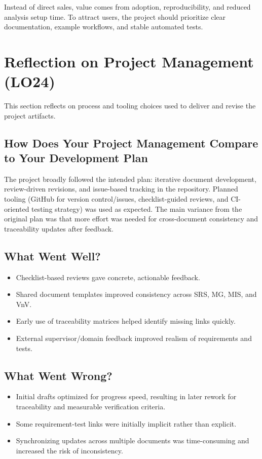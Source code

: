 \documentclass{article}
\begin{document}
Instead of direct sales, value comes from adoption, reproducibility, and reduced
analysis setup time. To attract users, the project should prioritize clear
documentation, example workflows, and stable automated tests.

\section{Reflection on Project Management (LO24)}

This section reflects on process and tooling choices used to deliver and revise the
project artifacts.

\subsection{How Does Your Project Management Compare to Your Development Plan}

The project broadly followed the intended plan: iterative document development,
review-driven revisions, and issue-based tracking in the repository. Planned tooling
(GitHub for version control/issues, checklist-guided reviews, and CI-oriented
testing strategy) was used as expected. The main variance from the original plan was
that more effort was needed for cross-document consistency and traceability updates
after feedback.

\subsection{What Went Well?}

\begin{itemize}
  \item Checklist-based reviews gave concrete, actionable feedback.
  \item Shared document templates improved consistency across SRS, MG, MIS, and VnV.
  \item Early use of traceability matrices helped identify missing links quickly.
  \item External supervisor/domain feedback improved realism of requirements and tests.
\end{itemize}

\subsection{What Went Wrong?}

\begin{itemize}
  \item Initial drafts optimized for progress speed, resulting in later rework for
  traceability and measurable verification criteria.
  \item Some requirement-test links were initially implicit rather than explicit.
  \item Synchronizing updates across multiple documents was time-consuming and
  increased the risk of inconsistency.
\end{itemize}
\end{document}
